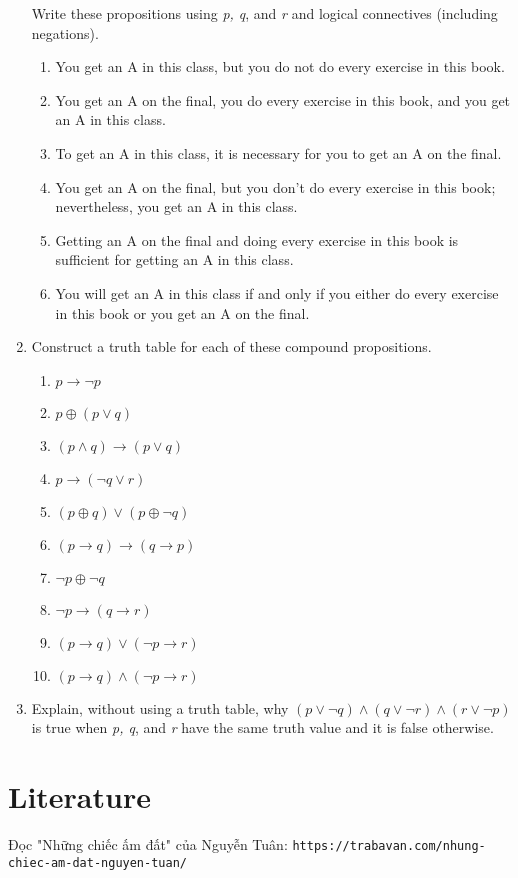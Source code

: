 \documentclass{article}
\begin{document}
\begin{enumerate}
            Write these propositions using \textit{p, q}, and \textit{r} and logical connectives (including negations).
            \begin{enumerate}
                \item You get an A in this class, but you do not do every exercise in this book.
                \item You get an A on the final, you do every exercise in this book, and you get an A in this class.
                \item To get an A in this class, it is necessary for you to get an A on the final.
                \item You get an A on the final, but you don't do every exercise in this book; nevertheless, you get an A in this class.
                \item Getting an A on the final and doing every exercise in this book is sufficient for getting an A in this class.
                \item You will get an A in this class if and only if you either do every exercise in this book or you get an A on the final. 
            \end{enumerate}
        \item Construct a truth table for each of these compound propositions.
            \begin{enumerate}
                \item $p \rightarrow \neg p $
                \item $p \oplus (p \vee q) $
                \item $(p \wedge q) \rightarrow (p \vee q)$
                \item $p \rightarrow (\neg q \vee r)$
                \item $(p \oplus q) \vee (p \oplus \neg q)$
                \item $(p \rightarrow q) \rightarrow (q \rightarrow p) $
                \item $\neg p \oplus \neg q$
                \item $\neg p \rightarrow (q \rightarrow r)$
                \item $(p \rightarrow q) \vee (\neg p \rightarrow r)$
                \item $(p \rightarrow q) \wedge (\neg p \rightarrow r)$
            \end{enumerate}
        \item Explain, without using a truth table, why $(p \vee \neg q) \wedge (q \vee \neg r) \wedge (r \vee \neg p)$ is true when \textit{p, q}, and \textit{r} have the same truth value and it is false otherwise.
    \end{enumerate}
    \section{Literature}
    Đọc "Những chiếc ấm đất" của Nguyễn Tuân: \texttt{https://trabavan.com/nhung-chiec-am-dat-nguyen-tuan/}
\end{document}
